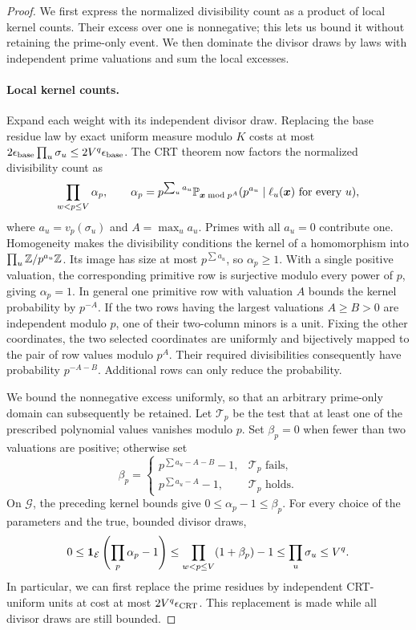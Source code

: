\begin{proof}
We first express the normalized divisibility count as a product of local
kernel counts.  Their excess over one is nonnegative; this lets us bound
it without retaining the prime-only event.  We then dominate the divisor
draws by laws with independent prime valuations and sum the local excesses.

\paragraph{Local kernel counts.}
Expand each weight with its independent divisor draw.  Replacing the
base residue law by exact uniform measure modulo \(K\) costs at
most \(2\epsilon_{\rm base}\prod_u\sigma_u
\le2V^q\epsilon_{\rm base}\).  The CRT theorem now factors the
normalized divisibility count as
\[
 \prod_{w<p\le V}\alpha_p,
 \qquad
 \alpha_p=p^{\sum_u a_u}
  \mathbb P_{\boldsymbol x\bmod p^{A}}
       (p^{a_u}\mid\ell_u(\boldsymbol x)\text{ for every }u),
\]
where \(a_u=v_p(\sigma_u)\) and \(A=\max_u a_u\).
Primes with all \(a_u=0\) contribute one.  Homogeneity makes the
divisibility conditions the kernel of a homomorphism into
\(\prod_u\mathbb Z/p^{a_u}\mathbb Z\).  Its image has size at most
\(p^{\sum a_u}\), so \(\alpha_p\ge1\).  With a single
positive valuation, the corresponding primitive row is surjective
modulo every power of \(p\), giving \(\alpha_p=1\).
In general one primitive row with valuation \(A\) bounds the
kernel probability by \(p^{-A}\).  If the two rows having the
largest valuations \(A\ge B>0\) are independent modulo \(p\),
one of their two-column minors is a unit.  Fixing the other
coordinates, the two selected coordinates are uniformly and
bijectively mapped to the pair of row values modulo \(p^A\).
Their required divisibilities consequently have probability
\(p^{-A-B}\).  Additional rows can only reduce the probability.

We bound the nonnegative excess uniformly, so that an arbitrary
prime-only domain can subsequently be retained.  Let \(\mathcal T_p\)
be the test that at least one of the prescribed polynomial values
vanishes modulo \(p\).  Set \(\beta_p=0\) when fewer than two
valuations are positive; otherwise set
\[
 \beta_p=
 \begin{cases}
 p^{\sum a_u-A-B}-1,&\mathcal T_p\text{ fails},\\
 p^{\sum a_u-A}-1,&\mathcal T_p\text{ holds}.
 \end{cases}
\]
On \(\mathcal G\), the preceding kernel bounds give
\(0\le\alpha_p-1\le\beta_p\).  For every choice of the
parameters and the true, bounded divisor draws,
\begin{equation}\label{eq:local-excess-domination}
 0\le\mathbf 1_{\mathcal E}
       \left(\prod_p\alpha_p-1\right)
 \le\prod_{w<p\le V}(1+\beta_p)-1
 \le\prod_u\sigma_u\le V^q.
\end{equation}
In particular, we can first replace the prime residues by independent
CRT-uniform units at cost at most \(2V^q\epsilon_{\rm CRT}\).
This replacement is made while all divisor draws are still bounded.


\end{proof}
